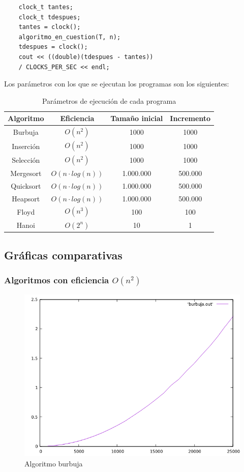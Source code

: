 \documentclass[12pt,spanish]{article}
\begin{document}
\begin{verbatim}
	clock_t tantes;
	clock_t tdespues;
	tantes = clock();
	algoritmo_en_cuestion(T, n);
	tdespues = clock();
	cout << ((double)(tdespues - tantes))
	/ CLOCKS_PER_SEC << endl;
\end{verbatim}

Los parámetros con los que se ejecutan los programas son los siguientes:
\begin{table}[H]
\centering
\begin{tabular}{|c|c|c|c|}
\hline
\textbf{Algoritmo} & \textbf{Eficiencia} & \textbf{Tamaño inicial} & \textbf{Incremento}\\
\hline
Burbuja & $O(n^2)$ & 1000 & 1000 \\
\hline
Inserción & $O(n^2)$ & 1000 & 1000 \\
\hline
Selección & $O(n^2)$ & 1000 & 1000 \\
\hline
Mergesort & $O(n \cdot log(n))$ & 1.000.000 & 500.000 \\
\hline
Quicksort & $O(n \cdot log(n))$ & 1.000.000 & 500.000 \\
\hline
Heapsort & $O(n \cdot log(n))$ & 1.000.000 & 500.000 \\
\hline
Floyd & $O(n^3)$ & 100 & 100 \\
\hline
Hanoi & $O(2^n)$ & 10 & 1 \\
\hline
\end{tabular}
\caption{Parámetros de ejecución de cada programa}
\end{table}
\subsection{Gráficas comparativas}

\subsubsection{Algoritmos con eficiencia $O(n^2)$}
\begin{figure}[H]
\centering
\includegraphics[scale=0.75]{empirica_burbuja.png}
\caption{Algoritmo burbuja}
\end{figure}
\end{document}
